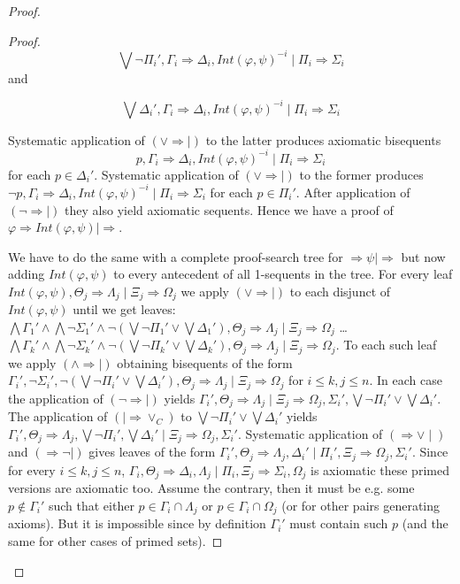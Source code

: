 \documentclass[10pt,a4paper]{article}
\theoremstyle{definition}
\newcommand{\3}{\vspace{.3in}}
\newcommand{\2}{\vspace{.2in}}
\newcommand{\1}{\vspace{.1in}}
\newcommand{\5}{\vspace{.05in}}
\begin{document}
\begin{proof}
\begin{proof}
$$\bigvee\neg\Pi_i', \Gamma_i\Rightarrow\Delta_i, Int(\varphi, \psi)^{-i}\mid  \Pi_i\Rightarrow\Sigma_i$$ and 

$$\bigvee\Delta_i',\Gamma_i\Rightarrow\Delta_i, Int(\varphi, \psi)^{-i}\mid  \Pi_i\Rightarrow\Sigma_i$$

Systematic application of $(\vee\Rightarrow\mid)$ to the latter produces axiomatic bisequents $$p,\Gamma_i\Rightarrow\Delta_i, Int(\varphi, \psi)^{-i}\mid  \Pi_i\Rightarrow\Sigma_i$$ for each $p\in \Delta_i'$. Systematic application of $(\vee\Rightarrow\mid)$ to the former produces $\neg p,\Gamma_i\Rightarrow\Delta_i, Int(\varphi, \psi)^{-i}\mid  \Pi_i\Rightarrow\Sigma_i$ for each $p\in \Pi_i'$. After application of $(\neg\Rightarrow\mid)$ they also yield axiomatic sequents.
Hence we have a proof of $\varphi\Rightarrow Int(\varphi, \psi)\mid\Rightarrow$.

We have to do the same with a complete proof-search tree for $\Rightarrow\psi\mid\Rightarrow$ but now adding $Int(\varphi, \psi)$ to every antecedent of all 1-sequents in the tree. For every leaf 
$Int(\varphi, \psi), \Theta_j\Rightarrow\Lambda_j\mid\Xi_j\Rightarrow\Omega_j$  we apply $(\vee\Rightarrow|)$ to each disjunct of $Int(\varphi, \psi)$ until we get leaves: $\bigwedge\Gamma_1'\wedge \bigwedge\neg\Sigma_1'\wedge \neg(\bigvee\neg\Pi_1'\vee\bigvee\Delta_1'), \Theta_j\Rightarrow\Lambda_j\mid\Xi_j\Rightarrow\Omega_j$ \ldots 
$\bigwedge\Gamma_k'\wedge \bigwedge\neg\Sigma_k'\wedge \neg(\bigvee\neg\Pi_k'\vee\bigvee\Delta_k'), \Theta_j\Rightarrow\Lambda_j\mid\Xi_j\Rightarrow\Omega_j$.
To each such leaf we apply $(\wedge\Rightarrow\mid)$ obtaining bisequents of the form $\Gamma_i', \neg\Sigma_i', \neg(\bigvee\neg\Pi_i'\vee\bigvee\Delta_i'), \Theta_j\Rightarrow\Lambda_j\mid\Xi_j\Rightarrow\Omega_j$ for $i\leq k, j\leq n$.
In each case the application of $(\neg\Rightarrow\mid)$ yields
$\Gamma_i', \Theta_j\Rightarrow\Lambda_j\mid\Xi_j\Rightarrow\Omega_j, \Sigma_i', \bigvee\neg\Pi_i'\vee\bigvee\Delta_i'$. 
The application of $(\mid\Rightarrow\vee_C)$ to  $\bigvee\neg\Pi_i'\vee\bigvee\Delta_i' $ yields
$\Gamma_i', \Theta_j\Rightarrow\Lambda_j,  \bigvee\neg\Pi_i', \bigvee\Delta_i'\mid\Xi_j\Rightarrow\Omega_j, \Sigma_i'$. Systematic application of $(\Rightarrow\vee\mid)$ and $(\Rightarrow\neg\mid)$ gives leaves of the form
$\Gamma_i', \Theta_j\Rightarrow\Lambda_j,  \Delta_i'\mid\Pi_i', \Xi_j\Rightarrow\Omega_j, \Sigma_i'$. Since for every $i\leq k, j\leq n$, $\Gamma_i, \Theta_j\Rightarrow\Delta_i, \Lambda_j\mid\Pi_i, \Xi_j\Rightarrow\Sigma_i, \Omega_j$ is axiomatic these primed versions are 
axiomatic too. Assume the contrary, then it must be e.g. some $p\notin \Gamma_i'$ such that either $p\in\Gamma_i\cap\Lambda_j $ or $p\in \Gamma_i\cap \Omega_j$ (or for other pairs generating axioms). But it is impossible since by definition $\Gamma_i'$ must contain such $p$ (and the same for other cases of primed sets).


\end{proof}
\end{proof}
\end{document}
